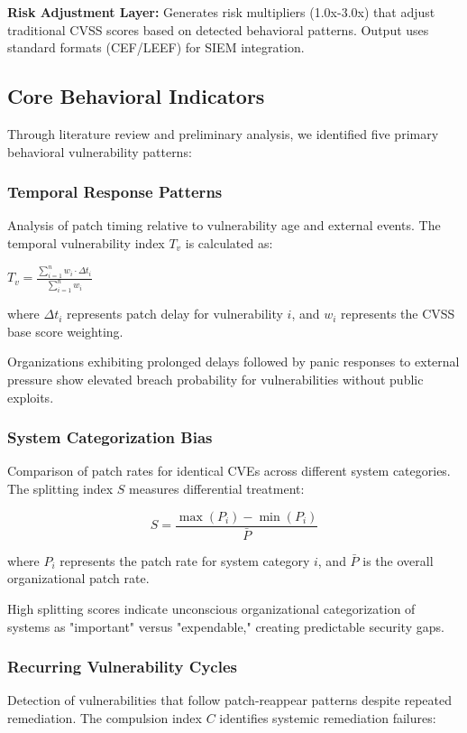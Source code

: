 \documentclass[10pt, twocolumn]{article}
\begin{document}
\textbf{Risk Adjustment Layer:} Generates risk multipliers (1.0x-3.0x) that adjust traditional CVSS scores based on detected behavioral patterns. Output uses standard formats (CEF/LEEF) for SIEM integration.

\subsection{Core Behavioral Indicators}

Through literature review and preliminary analysis, we identified five primary behavioral vulnerability patterns:

\subsubsection{Temporal Response Patterns}
Analysis of patch timing relative to vulnerability age and external events. The temporal vulnerability index $T_v$ is calculated as:

$T_v = \frac{\sum_{i=1}^{n} w_i \cdot \Delta t_i}{\sum_{i=1}^{n} w_i}$

where $\Delta t_i$ represents patch delay for vulnerability $i$, and $w_i$ represents the CVSS base score weighting.

Organizations exhibiting prolonged delays followed by panic responses to external pressure show elevated breach probability for vulnerabilities without public exploits.

\subsubsection{System Categorization Bias}
Comparison of patch rates for identical CVEs across different system categories. The splitting index $S$ measures differential treatment:

$$S = \frac{\max(P_i) - \min(P_i)}{\bar{P}}$$

where $P_i$ represents the patch rate for system category $i$, and $\bar{P}$ is the overall organizational patch rate.

High splitting scores indicate unconscious organizational categorization of systems as "important" versus "expendable," creating predictable security gaps.

\subsubsection{Recurring Vulnerability Cycles}
Detection of vulnerabilities that follow patch-reappear patterns despite repeated remediation. The compulsion index $C$ identifies systemic remediation failures:
\end{document}
